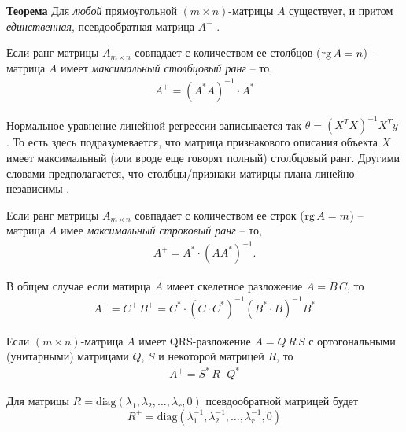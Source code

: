 \documentclass[%
	11pt,
	a4paper,
	utf8,
		]{article}
\begin{document}
\textbf{Теорема} Для \emph{любой} прямоугольной $ (m \times n) $-матрицы $ A $ существует, и притом \emph{единственная}, псевдообратная матрица $ A^+ $ \cite[]{shevtsov:linal-2012}.

Если ранг матрицы $ A_{m \times n} $ совпадает с количеством ее столбцов ($ \operatorname*{rg} A = n $) -- матрица $ A $ имеет \emph{максимальный столбцовый ранг} -- то,
\begin{align*}
	A^+ = (A^* A)^{-1} \cdot A^*
\end{align*}

Нормальное уравнение линейной регрессии записывается так $ \theta = (X^T X)^{-1} X^T y $ \cite[]{geron:ml-2018}. То есть здесь подразумевается, что матрица признакового описания объекта $ X $ имеет максимальный (или вроде еще говорят полный) столбцовый ранг. Другими словами предполагается, что столбцы/признаки матирцы плана линейно независимы \cite[]{shevtsov:linal-2012}.


Если ранг матрицы $ A_{m \times n} $ совпадает с количеством ее строк ($ \operatorname*{rg} A = m $) -- матрица $ A $ имее \emph{максимальный строковый ранг} -- то,
\begin{align*}
	A^+ = A^* \cdot (A A^*)^{-1}.
\end{align*}

В общем случае если матирца $ A $ имеет скелетное разложение $ A = B \, C $, то
\begin{align*}
	A^+ = C^+ \, B^+ = C^* \cdot (C \cdot C^*)^{-1} (B^* \cdot B)^{-1} B^*
\end{align*}

Если $ (m \times n) $-матрица $ A $ имеет QRS-разложение $ A = Q\,R\,S $ с ортогональными (унитарными) матрицами $ Q $, $ S $ и некоторой матрицей $ R $, то \cite[]{shevtsov:linal-2012}
\begin{align*}
	A^+ = S^* \, R^+ Q^*
\end{align*}

Для матрицы $ R = \text{diag}(\lambda_1, \lambda_2, \ldots, \lambda_r, 0) $ псевдообратной матрицей будет
$$
R^+ = \text{diag}(\lambda_1^{-1}, \lambda_2^{-1}, \ldots, \lambda_r^{-1}, 0)
$$
\end{document}

